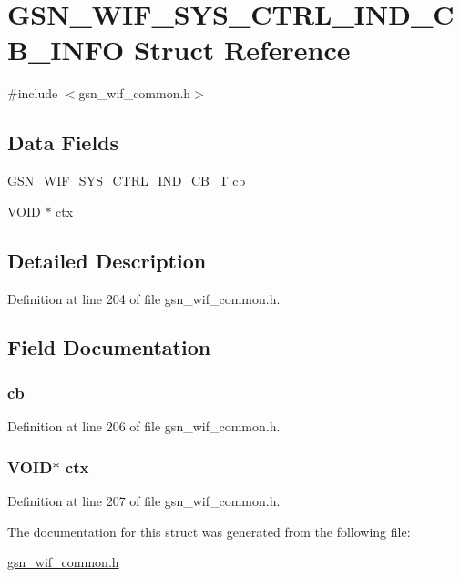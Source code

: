 \hypertarget{a00349}{
\section{GSN\_\-WIF\_\-SYS\_\-CTRL\_\-IND\_\-CB\_\-INFO Struct Reference}
\label{a00349}
}


{\ttfamily \#include $<$gsn\_\-wif\_\-common.h$>$}

\subsection*{Data Fields}
\begin{DoxyCompactItemize}
\item 
\hyperlink{a00635_ga6079bd2ef0b375f3d1b987c9e3de8f6b}{GSN\_\-WIF\_\-SYS\_\-CTRL\_\-IND\_\-CB\_\-T} \hyperlink{a00349_a741993a750965178691d8e4e5bd68240}{cb}
\item 
VOID $\ast$ \hyperlink{a00349_add401254b29adaa41706c97d1c8d3e89}{ctx}
\end{DoxyCompactItemize}


\subsection{Detailed Description}


Definition at line 204 of file gsn\_\-wif\_\-common.h.



\subsection{Field Documentation}
\hypertarget{a00349_a741993a750965178691d8e4e5bd68240}{
\subsubsection[{cb}]{ {\bf cb}}}
\label{a00349_a741993a750965178691d8e4e5bd68240}


Definition at line 206 of file gsn\_\-wif\_\-common.h.

\hypertarget{a00349_add401254b29adaa41706c97d1c8d3e89}{
\subsubsection[{ctx}]{\setlength{\rightskip}{0pt plus 5cm}VOID$\ast$ {\bf ctx}}}
\label{a00349_add401254b29adaa41706c97d1c8d3e89}


Definition at line 207 of file gsn\_\-wif\_\-common.h.



The documentation for this struct was generated from the following file:\begin{DoxyCompactItemize}
\item 
\hyperlink{a00608}{gsn\_\-wif\_\-common.h}\end{DoxyCompactItemize}
